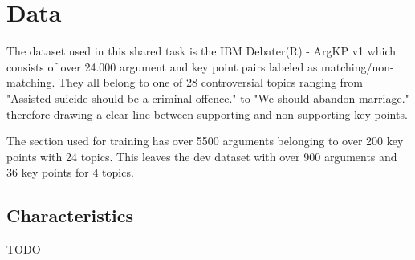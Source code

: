 \section{Data}

The dataset used in this shared task is the IBM Debater(R) - ArgKP v1 \cite{bar2020arguments} which consists of over 
24.000 argument and key point pairs labeled as matching/non-matching.
They all belong to one of 28 controversial topics ranging from "Assisted suicide should be a criminal offence." to 
"We should abandon marriage." therefore drawing a clear line between supporting and non-supporting key points.

The section used for training has over 5500 arguments belonging to over 200 key points with 24 topics. This leaves the 
dev dataset with over 900 arguments and 36 key points for 4 topics.

\subsection{Characteristics}

TODO 
